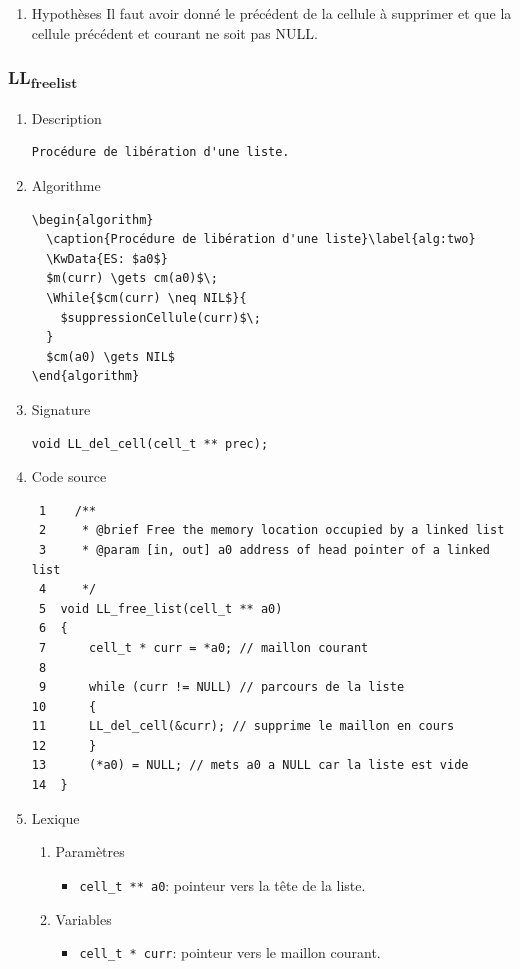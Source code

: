 \documentclass[11pt]{article}
\begin{document}
\begin{enumerate}
\item Hypothèses
\label{sec:orgf4b3387}
Il faut avoir donné le précédent de la cellule à supprimer et que la cellule
précédent et courant ne soit pas NULL.
\end{enumerate}

\subsubsection{LL\textsubscript{free}\textsubscript{list}}
\label{sec:orga5e8651}
\begin{enumerate}
\item Description
\label{sec:orgc567e25}

\begin{verbatim}
Procédure de libération d'une liste.
\end{verbatim}

\item Algorithme
\label{sec:orgd7939a3}

\begin{verbatim}
\begin{algorithm}
  \caption{Procédure de libération d'une liste}\label{alg:two}
  \KwData{ES: $a0$}
  $m(curr) \gets cm(a0)$\;
  \While{$cm(curr) \neq NIL$}{
    $suppressionCellule(curr)$\;
  }
  $cm(a0) \gets NIL$
\end{algorithm}
\end{verbatim}

\item Signature
\label{sec:orgdc136f0}

\begin{verbatim}
void LL_del_cell(cell_t ** prec);
\end{verbatim}

\item Code source
\label{sec:orgf22e9e3}

\begin{verbatim}
 1    /**
 2     * @brief Free the memory location occupied by a linked list
 3     * @param [in, out] a0 address of head pointer of a linked list
 4     */
 5  void LL_free_list(cell_t ** a0)
 6  {
 7      cell_t * curr = *a0; // maillon courant
 8  
 9      while (curr != NULL) // parcours de la liste
10      {
11  	LL_del_cell(&curr); // supprime le maillon en cours
12      }
13      (*a0) = NULL; // mets a0 a NULL car la liste est vide
14  }
\end{verbatim}

\item Lexique
\label{sec:orgeabab4c}
\begin{enumerate}
\item Paramètres
\label{sec:org2c1b7bc}
\begin{itemize}
\item \texttt{cell\_t ** a0}: pointeur vers la tête de la liste.
\end{itemize}
\item Variables
\label{sec:org644d213}
\begin{itemize}
\item \texttt{cell\_t * curr}: pointeur vers le maillon courant.
\end{itemize}
\end{enumerate}


\end{enumerate}
\end{document}

